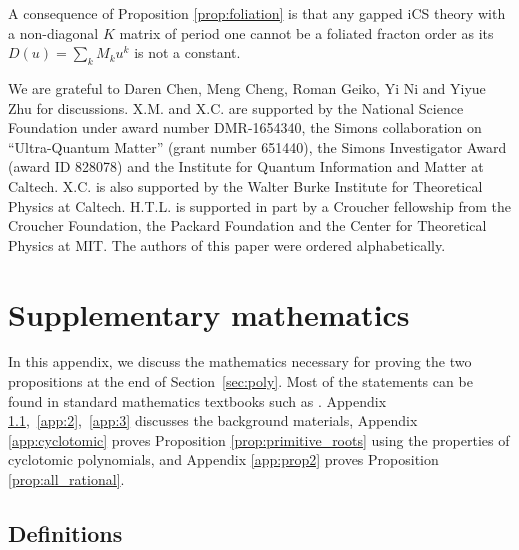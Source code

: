 \documentclass[aps,prb,twocolumn,superscriptaddress,floatfix,10pt,nofootinbib]{revtex4-2}
\theoremstyle{definition}
\begin{document}
A consequence of Proposition \ref{prop:foliation} is that any gapped iCS theory with a non-diagonal $K$ matrix of period one cannot be a foliated fracton order as its $D(u)=\sum_{k}M_{k}u^k$ is not a constant. 


\begin{acknowledgements}
We are grateful to Daren Chen, Meng Cheng, Roman Geiko, Yi Ni and Yiyue Zhu for discussions. X.M. and X.C. are supported by the National Science Foundation under award number DMR-1654340, the Simons collaboration on ``Ultra-Quantum Matter'' (grant number 651440), the Simons Investigator Award (award ID 828078) and the Institute for Quantum Information and Matter at Caltech. X.C. is also supported by the Walter Burke Institute for Theoretical Physics at Caltech.  H.T.L. is supported in part by a Croucher fellowship from the Croucher Foundation, the Packard
Foundation and the Center for Theoretical Physics at MIT. The authors of this paper were ordered
alphabetically.
\end{acknowledgements}

\appendix

\section{Supplementary mathematics}
\label{app:math}

In this appendix, we discuss the mathematics necessary for proving the two propositions at the end of Section~\ref{sec:poly}. Most of the statements can be found in standard mathematics textbooks such as \cite{cohn2000classic, Hecke1981}. Appendix \ref{app:1},~\ref{app:2},~\ref{app:3} discusses the background materials, Appendix \ref{app:cyclotomic} proves Proposition \ref{prop:primitive_roots} using the properties of cyclotomic polynomials, and Appendix \ref{app:prop2} proves Proposition \ref{prop:all_rational}.

\subsection{Definitions}\label{app:1}
\end{document}
